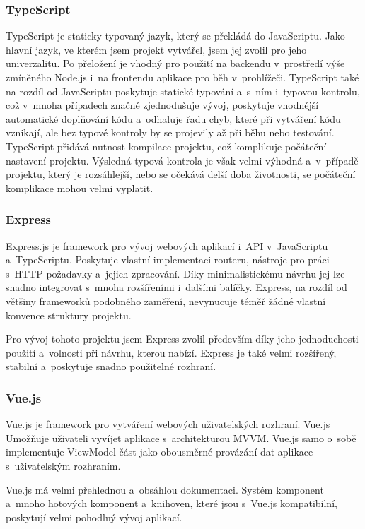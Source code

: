\documentclass[
  tables=false,
  glossaries,
  index
]{kidiplom}
\begin{document}
\subsubsection{TypeScript}
TypeScript\cite{typescript} je staticky typovaný jazyk, který se překládá do JavaScriptu. Jako hlavní jazyk, ve kterém jsem projekt vytvářel, jsem jej zvolil pro jeho univerzalitu. Po přeložení je vhodný pro použití na backendu v~prostředí výše zmíněného Node.js i~na frontendu aplikace pro běh v~prohlížeči. TypeScript také na rozdíl od JavaScriptu poskytuje statické typování a~s~ním i~typovou kontrolu, což v~mnoha případech značně zjednodušuje vývoj, poskytuje vhodnější automatické doplňování kódu a~odhaluje řadu chyb, které při vytváření kódu vznikají, ale bez typové kontroly by se projevily až při běhu nebo testování. TypeScript přidává nutnost kompilace projektu, což komplikuje počáteční nastavení projektu. Výsledná typová kontrola je však velmi výhodná a~v~případě projektu, který je rozsáhlejší, nebo se očekává delší doba životnosti, se počáteční komplikace mohou velmi vyplatit.

\subsubsection{Express}
Express.js\cite{express} je framework pro vývoj webových aplikací i~API v~JavaScriptu a~TypeScriptu. Poskytuje vlastní implementaci routeru, nástroje pro práci s~HTTP požadavky a~jejich zpracování. Díky minimalistickému návrhu jej lze snadno integrovat s~mnoha rozšířeními i~dalšími balíčky. Express, na rozdíl od většiny frameworků podobného zaměření, nevynucuje téměř žádné vlastní konvence struktury projektu.

Pro vývoj tohoto projektu jsem Express zvolil především díky jeho jednoduchosti použití a~volnosti při návrhu, kterou nabízí. Express je také velmi rozšířený, stabilní a~poskytuje snadno použitelné rozhraní.

\subsubsection{Vue.js}
Vue.js\cite{vuejs} je framework pro vytváření webových uživatelských rozhraní. Vue.js Umožňuje uživateli vyvíjet aplikace s~architekturou MVVM\cite{vue-mvvm}. Vue.js samo o~sobě implementuje ViewModel část jako obousměrné provázání dat aplikace s~uživatelským rozhraním.

Vue.js má velmi přehlednou a~obsáhlou dokumentaci. Systém komponent a~mnoho hotových komponent a~knihoven, které jsou s~Vue.js kompatibilní, poskytují velmi pohodlný vývoj aplikací.
\end{document}
